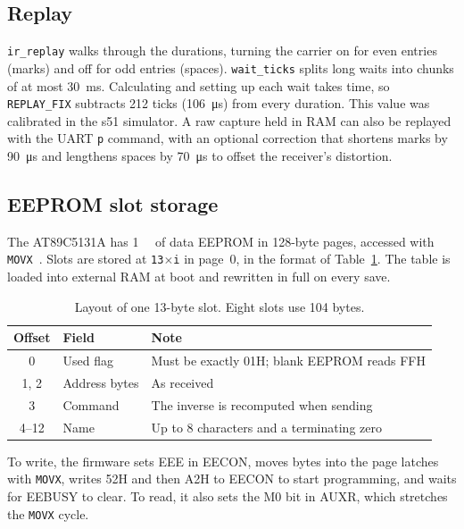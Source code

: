 \documentclass[11pt,a4paper]{article}
\newcommand{\code}[1]{\texttt{#1}}
\begin{document}
\subsection{Replay}

\code{ir\_replay} walks through the durations, turning the carrier on for even entries (marks) and off for odd entries (spaces). \code{wait\_ticks} splits long waits into chunks of at most \qty{30}{\milli\second}. Calculating and setting up each wait takes time, so \code{REPLAY\_FIX} subtracts 212 ticks (\qty{106}{\micro\second}) from every duration. This value was calibrated in the s51 simulator. A raw capture held in RAM can also be replayed with the UART \code{p} command, with an optional correction that shortens marks by \qty{90}{\micro\second} and lengthens spaces by \qty{70}{\micro\second} to offset the receiver's distortion.

\subsection{EEPROM slot storage}

The AT89C5131A has \qty{1}{\kilo\byte} of data EEPROM in 128-byte pages, accessed with \code{MOVX}~\cite{at89c5131}. Slots are stored at \code{13$\times$i} in page~0, in the format of Table~\ref{tab:slot}. The table is loaded into external RAM at boot and rewritten in full on every save.

\begin{table}[H]
\centering
\caption{Layout of one 13-byte slot. Eight slots use 104 bytes.}
\label{tab:slot}
\begin{tabular}{cll}
\toprule
Offset & Field & Note\\
\midrule
0 & Used flag & Must be exactly 01H; blank EEPROM reads FFH\\
1, 2 & Address bytes & As received\\
3 & Command & The inverse is recomputed when sending\\
4--12 & Name & Up to 8 characters and a terminating zero\\
\bottomrule
\end{tabular}
\end{table}

To write, the firmware sets EEE in EECON, moves bytes into the page latches with \code{MOVX}, writes 52H and then A2H to EECON to start programming, and waits for EEBUSY to clear. To read, it also sets the M0 bit in AUXR, which stretches the \code{MOVX} cycle.


\end{document}
